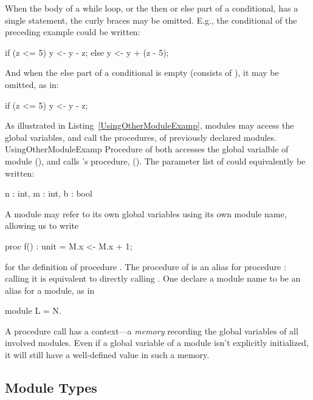 When the body of a while loop, or the then or else part of a conditional,
has a single statement, the curly braces may be omitted. E.g., the
conditional of the preceding example could be written:
\begin{easycrypt}{}{}
if (z <= 5) y <- y - z;
else y <- y + (z - 5);
\end{easycrypt}
And when the else part of a conditional is empty (consists of
\ec{\{\}}), it may be omitted, as in:
\begin{easycrypt}{}{}
if (z <= 5) y <- y - z;
\end{easycrypt}

As illustrated in Listing~\ref{UsingOtherModuleExamp}, modules may
access the global variables, and call the procedures, of previously
declared modules.
 {}{UsingOtherModuleExamp} Procedure
 of  both accesses the global varialble  of module
 (), and calls 's procedure,  ().
The parameter list of  could equivalently be written:
\begin{easycrypt}{}{}
n : int, m : int, b : bool  
\end{easycrypt}
A module may refer to its own global variables using its own module
name, allowing us to write
\begin{easycrypt}{}{}
proc f() : unit = {
  M.x <- M.x + 1;
}
\end{easycrypt}
for the definition of procedure .  The procedure  of
 is an alias for procedure : calling it is equivalent to
directly calling .
One declare a module name to be an alias for a module, as in
\begin{easycrypt}{}{}
module L = N.
\end{easycrypt}

A procedure call has a context---a \emph{memory} recording the global
variables of all involved modules.  Even if a global variable of a
module isn't explicitly initialized, it will still have a well-defined
value in such a memory.

\subsection{Module Types}

